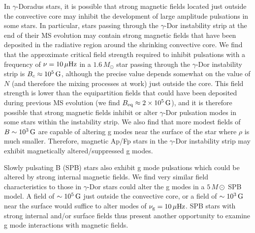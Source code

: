 In $\gamma$-Doradus stars, it is possible that strong magnetic fields located just outside the convective core may inhibit the development of large amplitude pulsations in some stars. In particular, stars passing through the $\gamma$-Dor instability strip at the end of their MS evolution may contain strong magnetic fields that have been deposited in the radiative region around the shrinking convective core. We find that the approximate critical field strength required to inhibit pulsations with a frequency of $\nu = 10 \, \mu {\rm Hz}$ in a $1.6 \, M_\odot$ star passing through the $\gamma$-Dor instability strip is $B_c \approx 10^5 \, {\rm G}$, although the precise value depends somewhat on the value of $N$ (and therefore the mixing processes at work) just outside the core. This field strength is lower than the equipartition fields that could have been deposited during previous MS evolution (we find $B_{\rm eq} \approx 2 \times 10^5 \, {\rm G}$), and it is therefore possible that strong magnetic fields inhibit or alter $\gamma$-Dor pulsation modes in some stars within the instability strip. We also find that more modest fields of $B \sim 10^{3} \, {\rm G}$ are capable of altering g modes near the surface of the star where $\rho$ is much smaller. Therefore, magnetic Ap/Fp stars in the $\gamma$-Dor instability strip may exhibit magnetically altered/suppressed g modes. 

Slowly pulsating B (SPB) stars also exhibit g mode pulsations which could be altered by strong internal magnetic fields. We find very similar field characteristics to those in $\gamma$-Dor stars could alter the g modes in a $5 \, M\odot$ SPB model. A field of $\sim 10^5 \, {\rm G}$ just outside the convective core, or a field of $\sim 10^{3} \, {\rm G}$ near the surface would suffice to alter modes of $\nu_{\rm g} = 10 \, \mu {\rm Hz}$. SPB stars with strong internal and/or surface fields thus present another opportunity to examine g mode interactions with magnetic fields.


  
  
  
  
  
  
  
  
  
  
  
  
  
  
  